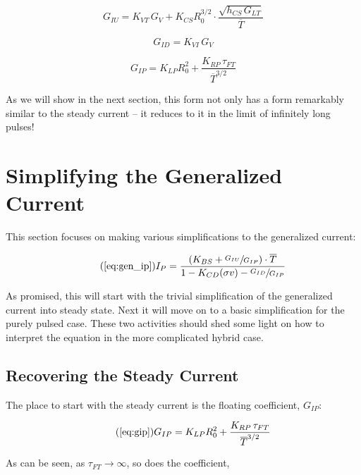 \begin{equation}
	G_{IU} = K_{VT} \, G_V + K_{CS} R_0^{3/2} \cdot \frac{ \sqrt{ h_{CS} \, G_{LT} } }{ \overline T }
\end{equation}

\begin{equation}
	G_{ID} = K_{VI} \, G_V
\end{equation}

\begin{equation}
	\label{eq:gip}
	G_{IP} = K_{LP} R_0^2 + \frac{ K_{RP} \, \tau_{FT} }{ \overline T ^ {3/2} }
\end{equation}

As we will show in the next section, this form not only has a form remarkably similar to the steady current -- it reduces to it in the limit of infinitely long pulses!

\section{Simplifying the Generalized Current}

This section focuses on making various simplifications to the generalized current:

\begin{equation}
	\tag{\ref{eq:gen_ip}}
	I_P = \frac{ \left( K_{BS} + \sfrac{ G_{IU} }{ G_{IP} } \right) \cdot \overline T }{ 1 - K_{CD} ( \sigma v ) - \sfrac{ G_{ID} }{ G_{IP} } }
\end{equation}

As promised, this will start with the trivial simplification of the generalized current into steady state. Next it will move on to a basic simplification for the purely pulsed case. These two activities should shed some light on how to interpret the equation in the more complicated hybrid case.

\subsection{Recovering the Steady Current}

The place to start with the steady current is the floating coefficient, $G_{IP}$:

\begin{equation}
	\tag{\ref{eq:gip}}
	G_{IP} = K_{LP} R_0^2 + \frac{ K_{RP} \, \tau_{FT} }{ \overline T ^ {3/2} }
\end{equation}

As can be seen, as $\tau_{FT} \to \infty$, so does the coefficient,

